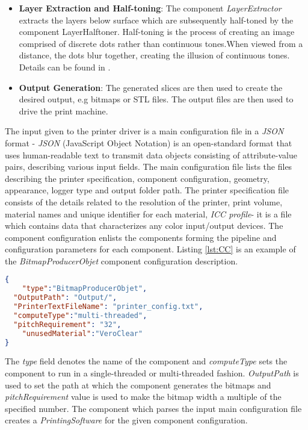 \begin{itemize}
\item \textbf{Layer Extraction and Half-toning}: The component \textit{LayerExtractor} extracts the layers below surface which are subsequently half-toned by the component LayerHalftoner. Half-toning is the process of creating an image comprised of discrete dots rather than continuous tones.When viewed from a distance, the dots blur together, creating the illusion of continuous tones. Details can be found in \cite{Brunton}. \newline

\item \textbf{Output Generation}: The generated slices are then used to create the desired output, e.g bitmaps or STL files. The output files are then used to drive the print machine. \newline

\end{itemize} 

The input given to the printer driver is a main configuration file in a \textit{JSON} format - \textit{JSON} (JavaScript Object Notation) is an open-standard format that uses human-readable text to transmit data objects consisting of attribute-value pairs, describing various input fields. The main configuration file lists the files describing the printer specification, component configuration, geometry, appearance, logger type and output folder path. The printer specification file consists of the details related to the resolution of the printer, print volume, material names and unique identifier for each material, \textit{ICC profile}- it is a file which contains data that characterizes any color input/output devices. The component configuration enlists the components forming the pipeline and configuration parameters for each component. Listing \ref{lst:CC} is an example of the \textit{BitmapProducerObjet} component configuration description. \newline

\begin{lstlisting}[language=json,label={lst:CC},caption={\textit{BitmapProducerObjet} Component Configuration}]
{
	"type":"BitmapProducerObjet",
  "OutputPath": "Output/",
  "PrinterTextFileName": "printer_config.txt",
  "computeType":"multi-threaded",
  "pitchRequirement": "32",
	"unusedMaterial":"VeroClear"
}
\end{lstlisting}

The \textit{type} field denotes the name of the component and \textit{computeType} sets the component to run in a single-threaded or multi-threaded fashion. \textit{OutputPath} is used to set the path at which the component generates the bitmaps and \textit{pitchRequirement} value is used to make the bitmap width a multiple of the specified number. The component which parses the input main configuration file creates a \textit{PrintingSoftware} for the given component configuration. 

